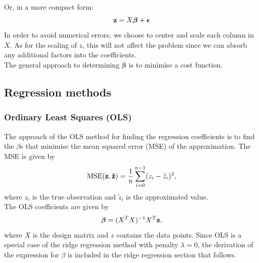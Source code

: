 \documentclass[notitlepage, reprint, nofootinbib]{revtex4-1}
\begin{document}
Or, in a more compact form: 
\begin{equation}\vb{z}=X\boldsymbol{\beta}+\boldsymbol{\epsilon}\end{equation}
In order to avoid numerical errors, we choose to center and scale each column in $X$. As for the scaling of $z$, this will not affect the problem since we can absorb any additional factors into the coefficients. \\[2mm]
The general approach to determining $\boldsymbol{\beta}$ is to minimise a cost function.

\newpage
\subsection{Regression methods}
\subsubsection{Ordinary Least Squares (OLS)}
The approach of the OLS method for finding the regression coefficients is to find the $\beta$s that minimise the mean squared error (MSE) of the approximation. The MSE is given by 
\begin{equation}\label{MSE}\text{MSE}(\vb{z},\vb{\tilde{z}} )= \frac{1}{n}\sum_{i=0}^{n-1}(z_i-\tilde{z}_i)^2,\end{equation}
where $z_i$ is the true observation and $\tilde{z}_i$ is the approximated value. \\[2mm]
The OLS coefficients are given by
\begin{equation}\label{OLS}\boldsymbol{\beta}= (X^TX)^{-1}X^T\vb{z},\end{equation}
where $X$ is the design matrix and $z$ contains the data points. Since OLS is a special case of the ridge regression method with penalty $\lambda=0$, the derivation of the expression for $\beta$ is included in the ridge regression section that follows. 
\end{document}
